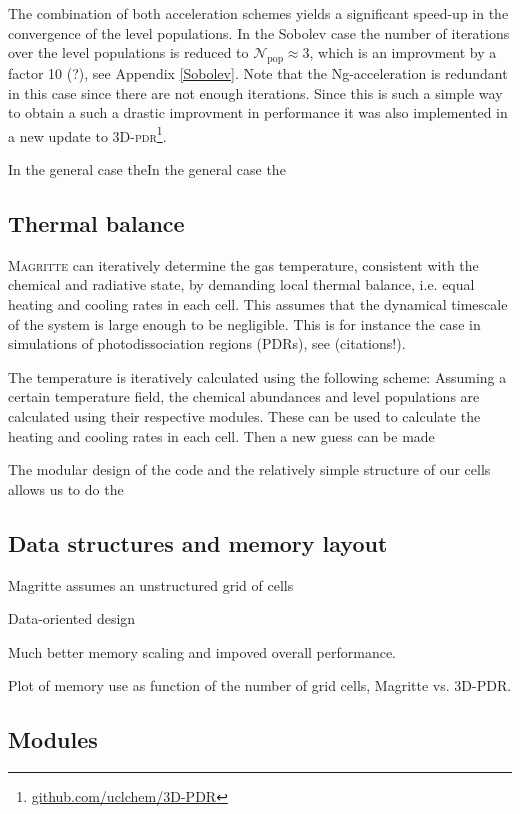 \documentclass[a4paper,fleqn,usenatbib]{mnras}
\begin{document}
The combination of both acceleration schemes yields a significant speed-up in the convergence of the level populations. In the Sobolev case the number of iterations over the level populations is reduced to $\mathcal{N}_{\text{pop}} \approx 3$, which is an improvment by a factor 10 (?), see Appendix \ref{Sobolev}. Note that the Ng-acceleration is redundant in this case since there are not enough iterations. Since this is such a simple way to obtain a such a drastic improvment in performance it was also implemented in a new update to \textsc{3D-pdr}\footnote{\href{https://github.com/uclchem/3D-PDR}{github.com/uclchem/3D-PDR}}.



In the general case theIn the general case the
\subsection{Thermal balance}

\textsc{Magritte} can iteratively determine the gas temperature, consistent with the chemical and radiative state, by demanding local thermal balance, i.e. equal heating and cooling rates in each cell. This assumes that the dynamical timescale of the system is large enough to be negligible. This is for instance the case in simulations of photodissociation regions (PDRs), see (citations!).

The temperature is iteratively calculated using the following scheme: Assuming a certain temperature field, the chemical abundances and level populations are calculated using their respective modules. These can be used to calculate the heating and cooling rates in each cell. Then a new guess can be made

The modular design of the code and the relatively simple structure of our cells allows us to do the



\subsection{Data structures and memory layout}

Magritte assumes an unstructured grid of cells

Data-oriented design


Much better memory scaling and impoved overall performance.

Plot of memory use as function of the number of grid cells, Magritte vs. 3D-PDR.

\subsection{Modules}
\end{document}

